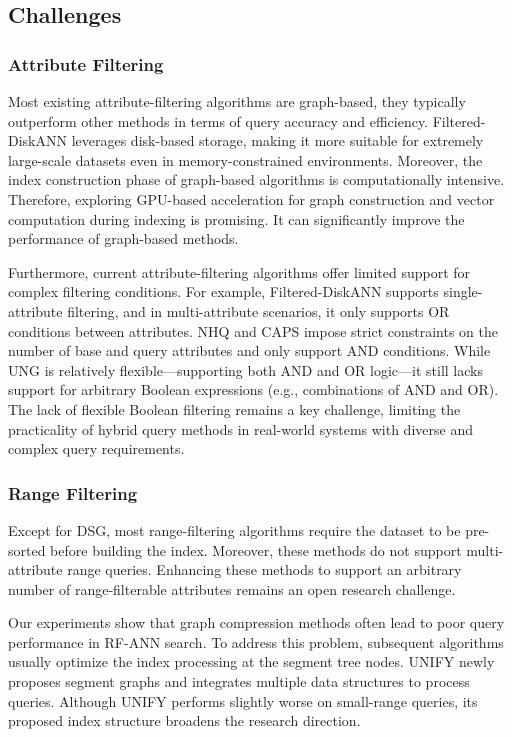 \documentclass[sigconf, nonacm]{acmart}
\begin{document}
\subsection{Challenges}
\subsubsection{\textbf{Attribute Filtering}}
Most existing attribute-filtering algorithms are graph-based, they typically outperform other methods in terms of query accuracy and efficiency. Filtered-DiskANN leverages disk-based storage, making it more suitable for extremely large-scale datasets even in memory-constrained environments. Moreover, the index construction phase of graph-based algorithms is computationally intensive. Therefore, exploring GPU-based acceleration for graph construction and vector computation during indexing is promising. It can significantly improve the performance of graph-based methods.

Furthermore, current attribute-filtering algorithms offer limited support for complex filtering conditions. For example, Filtered-DiskANN  supports single-attribute filtering, and in multi-attribute scenarios, it only supports OR conditions between attributes. 
NHQ and CAPS impose strict constraints on the number of base and query attributes and only support AND conditions. While UNG is relatively flexible—supporting both AND and OR logic—it still lacks support for arbitrary Boolean expressions (e.g., combinations of AND and OR). The lack of flexible Boolean filtering remains a key challenge, limiting the practicality of hybrid query methods in real-world systems with diverse and complex query requirements.

\subsubsection{\textbf{Range Filtering}}

Except for DSG, most range-filtering algorithms require the dataset to be pre-sorted before building the index. Moreover, these methods do not support multi-attribute range queries. Enhancing these methods to support an arbitrary number of range-filterable attributes remains an open research challenge.

Our experiments show that graph compression methods often lead to poor query performance in RF-ANN search. To address this problem, subsequent algorithms usually optimize the index processing at the segment tree nodes. UNIFY newly proposes segment graphs and integrates multiple data structures to process queries. Although UNIFY performs slightly worse on small-range queries, its proposed index structure broadens the research direction.
\end{document}
